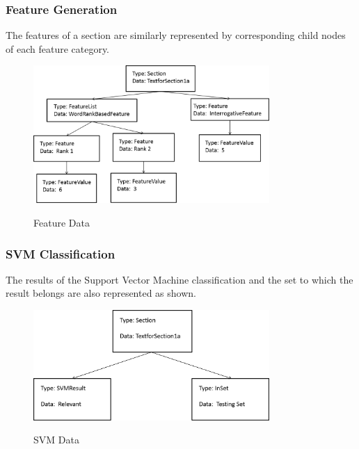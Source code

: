 \documentclass[10pt,a4paper]{report}
\begin{document}
\clearpage

\subsubsection{Feature Generation}

The features of a section are similarly represented by corresponding child nodes of each feature category. 

\begin{figure}[h!]
\centering
\includegraphics[width=0.80\textwidth]{./diagrams/tree5}\\
\caption{Feature Data}
\end{figure}

\subsubsection{SVM Classification}

The results of the Support Vector Machine classification and the set to which the result belongs are also represented as shown. 

\begin{figure}[h!]
\centering
\includegraphics[width=0.80\textwidth]{./diagrams/tree6}\\
\caption{SVM Data}
\end{figure}

\clearpage

\end{document}
